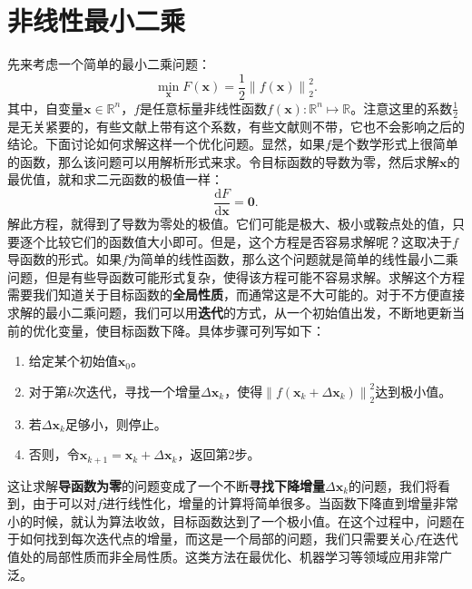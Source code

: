 \section{非线性最小二乘}
\label{sec:6.2}
先来考虑一个简单的最小二乘问题：
\begin{equation}
\mathop {\min }\limits_{\bm{x}} F(\bm{x}) = \frac{1}{2}{\left\| {f\left( \bm{x} \right)} \right\|^2_2}.
\end{equation}
其中，自变量$\bm{x} \in \mathbb{R}^n$，$f$是任意标量非线性函数$f(\bm{x}): \mathbb{R}^n \mapsto \mathbb{R}$。注意这里的系数$\frac{1}{2}$是无关紧要的，有些文献上带有这个系数，有些文献则不带，它也不会影响之后的结论。下面讨论如何求解这样一个优化问题。显然，如果$f$是个数学形式上很简单的函数，那么该问题可以用解析形式来求。令目标函数的导数为零，然后求解$\bm{x}$的最优值，就和求二元函数的极值一样：
\begin{equation}
\frac{ \mathrm{d} F}{ \mathrm{d} \bm{x} } = \bm{0}.
\end{equation}
解此方程，就得到了导数为零处的极值。它们可能是极大、极小或鞍点处的值，只要逐个比较它们的函数值大小即可。但是，这个方程是否容易求解呢？这取决于$f$导函数的形式。如果$f$为简单的线性函数，那么这个问题就是简单的线性最小二乘问题，但是有些导函数可能形式复杂，使得该方程可能不容易求解。求解这个方程需要我们知道关于目标函数的\textbf{全局性质}，而通常这是不大可能的。对于不方便直接求解的最小二乘问题，我们可以用\textbf{迭代}的方式，从一个初始值出发，不断地更新当前的优化变量，使目标函数下降。具体步骤可列写如下：

\begin{mdframed}  
\begin{enumerate}
	\item 给定某个初始值$\bm{x}_0$。
	\item 对于第$k$次迭代，寻找一个增量$\Delta \bm{x}_k$，使得$\left\| {f\left( \bm{x}_k + \Delta \bm{x}_k \right)} \right \|^2_2$达到极小值。
	\item 若$\Delta \bm{x}_k$足够小，则停止。
	\item 否则，令$\bm{x}_{k+1} = \bm{x}_k+\Delta \bm{x}_k$，返回第2步。
\end{enumerate}
\end{mdframed}
这让求解\textbf{导函数为零}的问题变成了一个不断\textbf{寻找下降增量}$\Delta \bm{x}_k$的问题，我们将看到，由于可以对$f$进行线性化，增量的计算将简单很多。当函数下降直到增量非常小的时候，就认为算法收敛，目标函数达到了一个极小值。在这个过程中，问题在于如何找到每次迭代点的增量，而这是一个局部的问题，我们只需要关心$f$在迭代值处的局部性质而非全局性质。这类方法在最优化、机器学习等领域应用非常广泛。

